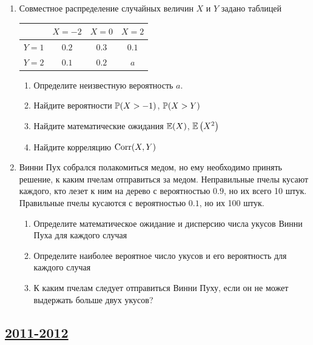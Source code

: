 \begin{enumerate}
\item Совместное распределение случайных величин $X$ и $Y$ задано таблицей

\begin{center}
\begin{tabular}{@{}cccc@{}}
\toprule
      & $X=-2$ & $X=0$ & $X=2$ \\ \midrule
$Y=1$ & $0.2$  & $0.3$ & $0.1$ \\
$Y=2$ & $0.1$  & $0.2$ & $a$   \\ \bottomrule
\end{tabular}
\end{center}

\begin{enumerate}
\item Определите неизвестную вероятность $a$.
\item Найдите вероятности $\P(X>-1)$, $\P(X>Y)$
\item Найдите математические ожидания $\E(X)$, $\E\left(X^2\right)$
\item Найдите корреляцию $\Corr(X,Y)$
\end{enumerate}

\item Винни Пух собрался полакомиться медом, но ему необходимо принять решение,
к каким пчелам отправиться за медом. Неправильные пчелы кусают каждого, кто лезет
к ним на дерево с вероятностью $0.9$, но их всего 10 штук. Правильные пчелы кусаются
с вероятностью $0.1$, но их 100 штук.
\begin{enumerate}
\item  Определите математическое ожидание и дисперсию числа укусов Винни Пуха для каждого случая
\item Определите наиболее вероятное число укусов и его вероятность для каждого случая
\item К каким пчелам следует отправиться Винни Пуху, если он не может выдержать больше двух укусов?
\end{enumerate}
\end{enumerate}


\newpage
\subsection[2011-2012]{\hyperref[sec:sol_kr_01_2011_2012]{2011-2012}}
\label{sec:kr_01_2011_2012}

